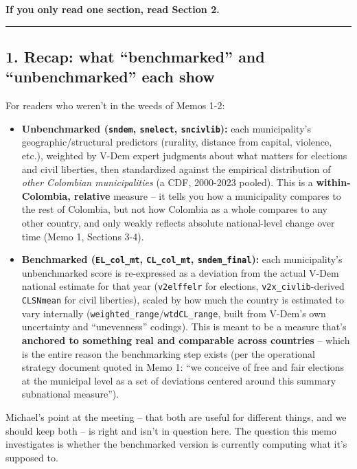 \documentclass[
]{article}
\begin{document}
\textbf{If you only read one section, read Section 2.}

\begin{center}\rule{0.5\linewidth}{0.5pt}\end{center}

\hypertarget{recap-what-benchmarked-and-unbenchmarked-each-show}{%
\subsection{1. Recap: what ``benchmarked'' and ``unbenchmarked'' each
show}\label{recap-what-benchmarked-and-unbenchmarked-each-show}}

For readers who weren't in the weeds of Memos 1-2:

\begin{itemize}
\item
  \textbf{Unbenchmarked (\texttt{sndem}, \texttt{snelect},
  \texttt{sncivlib}):} each municipality's geographic/structural
  predictors (rurality, distance from capital, violence, etc.), weighted
  by V-Dem expert judgments about what matters for elections and civil
  liberties, then standardized against the empirical distribution of
  \emph{other Colombian municipalities} (a CDF, 2000-2023 pooled). This
  is a \textbf{within-Colombia, relative} measure -- it tells you how a
  municipality compares to the rest of Colombia, but not how Colombia as
  a whole compares to any other country, and only weakly reflects
  absolute national-level change over time (Memo 1, Sections 3-4).
\item
  \textbf{Benchmarked (\texttt{EL\_col\_mt}, \texttt{CL\_col\_mt},
  \texttt{sndem\_final}):} each municipality's unbenchmarked score is
  re-expressed as a deviation from the actual V-Dem national estimate
  for that year (\texttt{v2elffelr} for elections,
  \texttt{v2x\_civlib}-derived \texttt{CLSNmean} for civil liberties),
  scaled by how much the country is estimated to vary internally
  (\texttt{weighted\_range}/\texttt{wtdCL\_range}, built from V-Dem's
  own uncertainty and ``unevenness'' codings). This is meant to be a
  measure that's \textbf{anchored to something real and comparable
  across countries} -- which is the entire reason the benchmarking step
  exists (per the operational strategy document quoted in Memo 1: ``we
  conceive of free and fair elections at the municipal level as a set of
  deviations centered around this summary subnational measure'').
\end{itemize}

Michael's point at the meeting -- that both are useful for different
things, and we should keep both -- is right and isn't in question here.
The question this memo investigates is whether the benchmarked version
is currently computing what it's supposed to.
\end{document}
